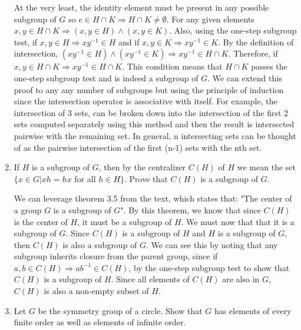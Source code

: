 \documentclass{article}
\begin{document}
\begin{enumerate}
\begin{flushleft}
    At the very least, the identity element must be present in any possible subgroup of $G$ so $e \in H \cap K \Rightarrow H \cap K \not= \emptyset$. For any given elements $x,y \in H \cap K \Rightarrow (x,y \in H) \wedge (x,y\in K)$. Also, using the one-step subgroup test, if $x,y \in H \Rightarrow xy^{-1} \in H$ and if $x,y \in K \Rightarrow xy^{-1} \in K$. By the definition of intersection, $(xy^{-1} \in H) \wedge (xy^{-1} \in K) \Rightarrow xy^{-1} \in H \cap K$. Therefore, if $x,y \in H \cap K \Rightarrow xy^{-1} \in H \cap K$. This condition means that $H \cap K$ passes the one-step subgroup test and is indeed a subgroup of $G$. We can extend this proof to any any number of subgroups but using the principle of induction since the intersection operator is associative with itself. For example, the intersection of 3 sets, can be broken down into the intersection of the first 2 sets computed separately using this method and then the result is intersected pairwise with the remaining set. In general, n intersecting sets can be thought of as the pairwise intersection of the first (n-1) sets with the nth set.
    \end{flushleft}
    \item If $H$ is a subgroup of $G$, then by the centralizer $C(H)$ of $H$ we mean the set $\{x \in G | xh = hx$ for all $h \in H\}$. Prove that $C(H)$ is a subgroup of $G$.
    \begin{flushleft}
    We can leverage theorem 3.5 from the text, which states that: "The center of a group $G$ is a subgroup of $G$". By this theorem, we know that since $C(H)$ is the center of $H$, it must be a subgroup of $H$. We must now that that it is a subgroup of $G$. Since $C(H)$ is a subgroup of $H$ and $H$ is a subgroup of $G$, then $C(H)$ is also a subgroup of $G$. We can see this by noting that any subgroup inherits closure from the parent group, since if $a, b \in C(H) \Rightarrow ab^{-1} \in C(H)$, by the one-step subgroup test to show that $C(H)$ is a subgroup of $H$. Since all elements of $C(H)$ are also in $G$, $C(H)$ is also a non-empty subset of $H$.
    \end{flushleft}
    \item Let $G$ be the symmetry group of a circle. Show that $G$ has elements of every finite order as well as elements of infinite order.
    \begin{flushleft}

\end{flushleft}
\end{enumerate}
\end{document}
